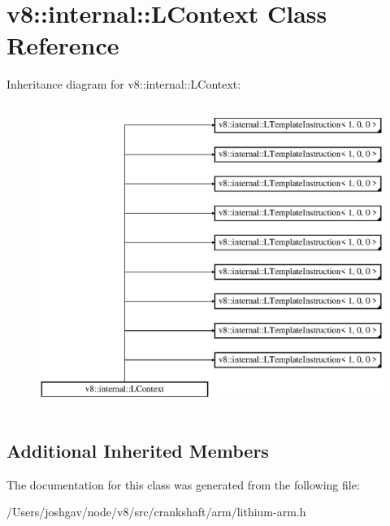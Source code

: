 \hypertarget{classv8_1_1internal_1_1_l_context}{}\section{v8\+:\+:internal\+:\+:L\+Context Class Reference}
\label{classv8_1_1internal_1_1_l_context}
Inheritance diagram for v8\+:\+:internal\+:\+:L\+Context\+:\begin{figure}[H]
\begin{center}
\leavevmode
\includegraphics[height=10.000000cm]{classv8_1_1internal_1_1_l_context}
\end{center}
\end{figure}
\subsection*{Additional Inherited Members}


The documentation for this class was generated from the following file\+:\begin{DoxyCompactItemize}
\item 
/\+Users/joshgav/node/v8/src/crankshaft/arm/lithium-\/arm.\+h\end{DoxyCompactItemize}
